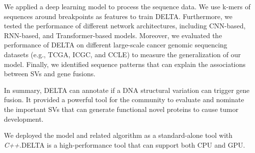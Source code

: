 \documentclass{article}
\begin{document}
We applied a deep learning model to process the sequence data. We use k-mers of sequences around breakpoints as features to train DELTA\@.
Furthermore, we tested the performance of different network architectures, including CNN-based, RNN-based, and Transformer-based models.
Moreover, we evaluated the performance of DELTA on different large-scale cancer genomic sequencing datasets (e.g., TCGA, ICGC, and CCLE) to measure the generalization of our model.
Finally, we identified sequence patterns that can explain the associations between SVs and gene fusions.

In summary, DELTA can annotate if a DNA structural variation can trigger gene fusion.
It provided a powerful tool for the community to evaluate and nominate the important SVs that can generate functional novel proteins to cause tumor development.

We deployed the model and related algorithm as a standard-alone tool with \textit{C++}.DELTA is a high-performance tool that can support both CPU and GPU\@.






% 
% 
\end{document}
